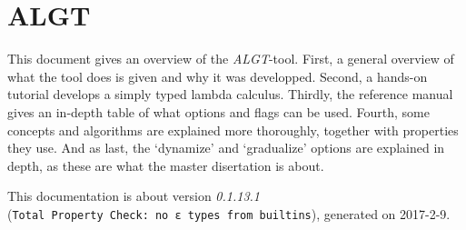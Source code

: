 \section{ALGT}\label{algt}

This document gives an overview of the \emph{ALGT}-tool. First, a
general overview of what the tool does is given and why it was
developped. Second, a hands-on tutorial develops a simply typed lambda
calculus. Thirdly, the reference manual gives an in-depth table of what
options and flags can be used. Fourth, some concepts and algorithms are
explained more thoroughly, together with properties they use. And as
last, the `dynamize' and `gradualize' options are explained in depth, as
these are what the master disertation is about.

This documentation is about version \emph{0.1.13.1}
(\texttt{Total\ Property\ Check:\ no\ ɛ\ types\ from\ builtins}),
generated on 2017-2-9.
